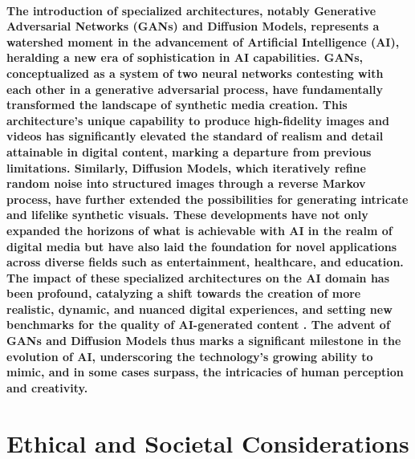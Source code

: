 \documentclass[11pt,a4paper,oneside]{report}
\begin{document}
\paragraph{The introduction of specialized architectures, notably Generative Adversarial Networks (GANs) and Diffusion Models, represents a watershed moment in the advancement of Artificial Intelligence (AI), heralding a new era of sophistication in AI capabilities. GANs, conceptualized as a system of two neural networks contesting with each other in a generative adversarial process, have fundamentally transformed the landscape of synthetic media creation. This architecture's unique capability to produce high-fidelity images and videos has significantly elevated the standard of realism and detail attainable in digital content, marking a departure from previous limitations. Similarly, Diffusion Models, which iteratively refine random noise into structured images through a reverse Markov process, have further extended the possibilities for generating intricate and lifelike synthetic visuals. These developments have not only expanded the horizons of what is achievable with AI in the realm of digital media but have also laid the foundation for novel applications across diverse fields such as entertainment, healthcare, and education. The impact of these specialized architectures on the AI domain has been profound, catalyzing a shift towards the creation of more realistic, dynamic, and nuanced digital experiences, and setting new benchmarks for the quality of AI-generated content \cite{granot2022drop}. The advent of GANs and Diffusion Models thus marks a significant milestone in the evolution of AI, underscoring the technology's growing ability to mimic, and in some cases surpass, the intricacies of human perception and creativity.}

\section{Ethical and Societal Considerations}
\end{document}
